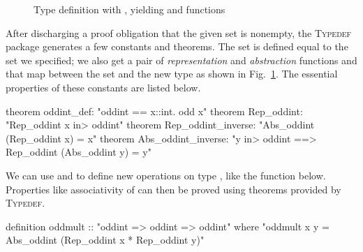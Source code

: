 \begin{figure}
\centering
\begin{singlespace}
\end{singlespace}

\caption{Type definition with , yielding  and  functions}
\label{fig:holcf-typedef}
\end{figure}

\noindent
After discharging a proof obligation that the given set  is nonempty, the \textsc{Typedef} package generates a few constants and theorems. The set  is defined equal to the set we specified; we also get a pair of \emph{representation} and \emph{abstraction} functions  and  that map between the set and the new type as shown in Fig.~\ref{fig:holcf-typedef}. The essential properties of these constants are listed below.

\begin{isacodes}
theorem oddint_def: "oddint == {x::int. odd x}"
theorem Rep_oddint: "Rep_oddint x \<in> oddint"
theorem Rep_oddint_inverse: "Abs_oddint (Rep_oddint x) = x"
theorem Abs_oddint_inverse: "y \<in> oddint ==> Rep_oddint (Abs_oddint y) = y"
\end{isacodes}

\noindent
We can use  and  to define new operations on type , like the function  below. Properties like associativity of  can then be proved using theorems provided by \textsc{Typedef}.

\begin{isacode}
definition oddmult :: "oddint => oddint => oddint"
  where "oddmult x y = Abs_oddint (Rep_oddint x * Rep_oddint y)"
\end{isacode}

